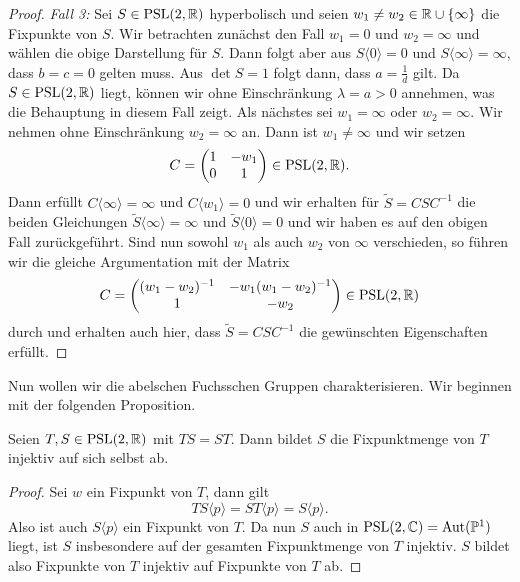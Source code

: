\begin{proof}
  \emph{Fall 3:} Sei $S \in \operatorname{PSL}(2, \mathbb{R})$ hyperbolisch und seien $w_1
  \neq w_2 \in \mathbb{R} \cup \{\infty\}$ die Fixpunkte von $S$. Wir
  betrachten zunächst den Fall $w_1 = 0$ und $w_2 = \infty$ und wählen
  die obige Darstellung für $S$. Dann folgt aber aus $S\langle 0
  \rangle = 0$ und $S\langle \infty \rangle = \infty$, dass $b = c = 0$
  gelten muss. Aus $\det S = 1$ folgt dann, dass $a = \frac{1}{d}$
  gilt. Da $S \in \operatorname{PSL}(2,\mathbb{R})$ liegt, können wir ohne Einschränkung
  $\lambda = a > 0$ annehmen, was die Behauptung in diesem Fall
  zeigt. Als nächstes sei $w_1 = \infty$ oder $w_2 = \infty$. Wir
  nehmen ohne Einschränkung $w_2 = \infty$ an. Dann ist $w_1 \neq
  \infty$ und wir setzen
  \[
  C =
  \begin{pmatrix}
    1 & - w_1\\
    0 & 1
  \end{pmatrix}
  \in \operatorname{PSL}(2, \mathbb{R}).
  \]
  Dann erfüllt $C\langle \infty \rangle = \infty$ und $C\langle w_1
  \rangle = 0$ und wir erhalten für $\tilde S = C S C^{-1}$ die beiden
  Gleichungen $\tilde S \langle \infty \rangle = \infty$ und $\tilde S
  \langle 0 \rangle = 0$ und wir haben es auf den obigen Fall
  zurückgeführt. Sind nun sowohl $w_1$ als auch $w_2$ von $\infty$
  verschieden, so führen wir die gleiche Argumentation mit der Matrix
  \[
  C =
  \begin{pmatrix}
    (w_1 - w_2)^{-1} & - w_1(w_1-w_2)^{-1}\\
    1 & -w_2
  \end{pmatrix}
  \in \operatorname{PSL}(2, \mathbb{R})
  \]
  durch und erhalten auch hier, dass $\tilde S = C S C^{-1}$ die
  gewünschten Eigenschaften erfüllt.
\end{proof}

Nun wollen wir die abelschen Fuchsschen Gruppen charakterisieren. Wir
beginnen mit der folgenden Proposition.

\begin{prop}
  \label{prop:komm-fix}
  Seien $T, S \in \operatorname{PSL}(2, \mathbb{R})$ mit $TS = ST$. Dann bildet $S$ die
  Fixpunktmenge von $T$ injektiv auf sich selbst ab.
\end{prop}

\begin{proof}
  Sei $w$ ein Fixpunkt von $T$, dann gilt
  \[
  TS \langle p \rangle = ST\langle p \rangle = S\langle p \rangle.
  \]
  Also ist auch $S\langle p \rangle$ ein Fixpunkt von $T$. Da nun $S$
  auch in $\operatorname{PSL}(2, \mathbb{C}) = \operatorname{Aut}(\mathbb{P}^1)$ liegt, ist $S$ insbesondere auf
  der gesamten Fixpunktmenge von $T$ injektiv. $S$ bildet also
  Fixpunkte von $T$ injektiv auf Fixpunkte von $T$ ab.
\end{proof}

